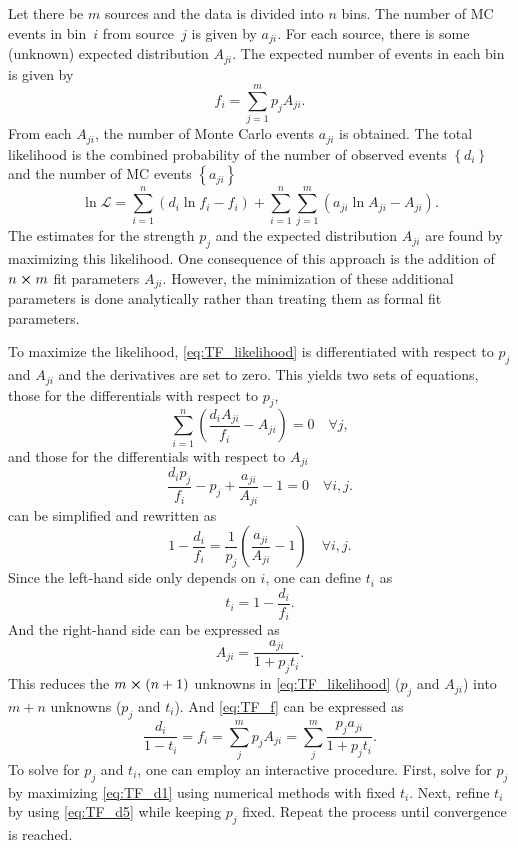 \documentclass[../main.tex]{subfiles}
\begin{document}
Let there be $m$ sources and the data is divided into $n$ bins.
The number of MC events in bin~$i$ from source~$j$ is given by $a_{ji}$.
For each source, there is some (unknown) expected distribution $A_{ji}$.
The expected number of events in each bin is given by
\begin{equation}
	f_i = \sum^m_{j=1} p_j A_{ji}.
	\label{eq:TF_f}
\end{equation}
From each $A_{ji}$, the number of Monte Carlo events $a_{ji}$ is obtained.
The total likelihood is the combined probability of the number of observed events $\left\{d_i\right\}$
and the number of MC events $\left\{a_{ji}\right\}$
\begin{equation}
	\ln \mathcal{L} = \sum^n_{i=1} \left(d_i \ln f_i -f_i\right) + \sum^n_{i=1} \sum^m_{j=1} \left(a_{ji} \ln A_{ji} - A_{ji}\right).
	\label{eq:TF_likelihood}
\end{equation}
The estimates for the strength $p_j$ and the expected distribution $A_{ji}$ are
found by maximizing this likelihood. One consequence of this approach is the addition of
$n \cross m$ fit parameters $A_{ji}$. However, the  minimization of these additional
parameters is done analytically rather than treating them as formal fit parameters.

To maximize the likelihood, \cref{eq:TF_likelihood} is differentiated with respect to $p_j$
and $A_{ji}$ and the derivatives are set to zero.
This yields two sets of equations, those for the differentials with respect to $p_j$,
\begin{equation}
	\sum^n_{i=1} \left(\frac{d_i A_{ji}}{f_i} -A_{ji}\right)=0\quad \forall j,
	\label{eq:TF_d1}
\end{equation}
and those for the differentials with respect to $A_{ji}$
\begin{equation}
	\frac{d_i p_j}{f_i} - p_j + \frac{a_{ji}}{A_{ji}}-1=0\quad \forall 	i,j.
	\label{eq:TF_d2}
\end{equation}
 can be simplified and rewritten as
\begin{equation}
	1-\frac{d_i}{f_i} = \frac{1}{p_j}\left(\frac{a_{ji}}{A_{ji}}-1\right)\quad \forall i,j.
	\label{eq:TF_d3}
\end{equation}
Since the left-hand side only depends on $i$, one can define $t_i$ as
\begin{equation}
	t_i= 1-\frac{d_i}{f_i}.
	\label{eq:TF_d4}
\end{equation}
And the right-hand side can be expressed as
\begin{equation}
	A_{ji}=\frac{a_{ji}}{1+p_j t_i}.
\end{equation}
This reduces the $m\cross \left(n+1\right)$ unknowns in \cref{eq:TF_likelihood} ($p_j$ and $A_{ji}$)
into $m+n$ unknowns ($p_j$ and $t_i$).
And \cref{eq:TF_f} can be expressed as
\begin{equation}
	\frac{d_i}{1-t_i}=f_i=\sum_j^m p_jA_{ji}=\sum_j^m \frac{p_j a_{ji}}{1+p_jt_i}.
	\label{eq:TF_d5}
\end{equation}
To solve for $p_j$ and $t_i$, one can employ an interactive procedure. First, solve for $p_j$ by maximizing
\cref{eq:TF_d1} using numerical methods with fixed $t_i$. Next, refine $t_i$ by using \cref{eq:TF_d5} while keeping
$p_j$ fixed. Repeat the process until convergence is reached.
\end{document}
